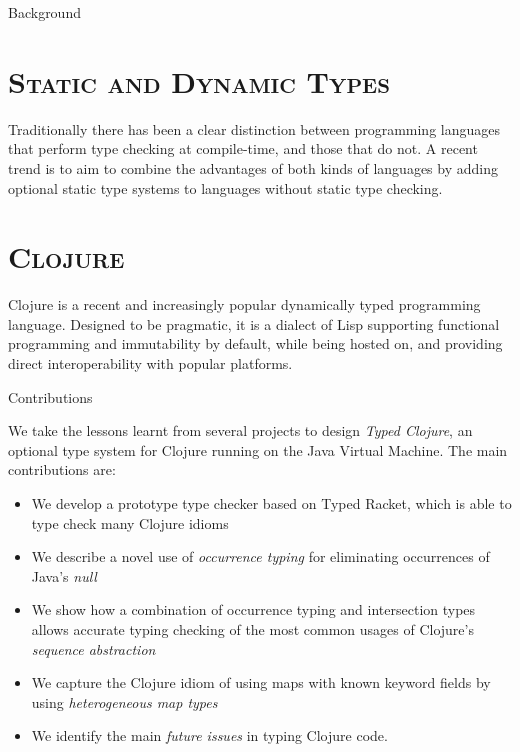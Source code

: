\documentclass[landscape,final,a0paper,fontscale=0.277]{baposter}
\begin{document}
\begin{poster}
  \begin{posterbox}[name=problem,column=0,row=0]{Background}

\section*{\textsc{Static and Dynamic Types}}

Traditionally there has been a clear distinction between 
programming languages that perform type checking at compile-time, and those that do not.
A recent trend is to aim to combine the advantages of both kinds of languages by adding optional static 
type systems to languages without static type checking.

\section*{\textsc{Clojure}}

Clojure is a recent and increasingly popular dynamically typed programming language.
Designed to be pragmatic, it is a dialect of Lisp supporting functional programming and immutability by default,
while being hosted on, and providing direct interoperability with popular platforms.
\end{posterbox}

\begin{posterbox}[name=contribution,column=0,below=problem]{Contributions}

We take the lessons learnt from several projects to design \emph{Typed Clojure},
an optional type system for Clojure running on the Java Virtual Machine. 
The main contributions are:
\begin{itemize}
  \item We develop a prototype type checker based on Typed Racket, which is able to type check many Clojure idioms
  \item We describe a novel use of \emph{occurrence typing} for eliminating occurrences of Java's \emph{null}
  \item We show how a combination of occurrence typing and intersection types allows accurate typing checking of
        the most common usages of Clojure's \emph{sequence abstraction} 
  \item We capture the Clojure idiom of using maps with known keyword fields by using \emph{heterogeneous map types}
  \item We identify the main \emph{future issues} in typing Clojure code.


\end{itemize}
\end{posterbox}
\end{poster}
\end{document}
